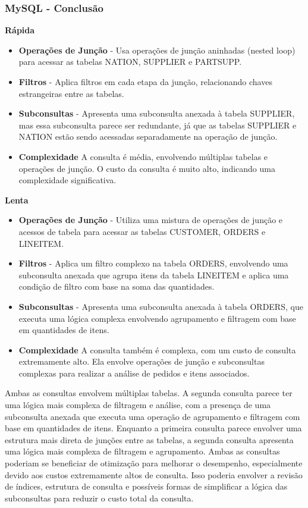 \documentclass{article}
\begin{document}
\subsubsection{MySQL - Conclusão}

  \textbf{Rápida}\\
  \begin{itemize}
    \item \textbf{Operações de Junção} - Usa operações de junção aninhadas (nested loop) para acessar as tabelas NATION, SUPPLIER e PARTSUPP.
    \item \textbf{Filtros} - Aplica filtros em cada etapa da junção, relacionando chaves estrangeiras entre as tabelas.
    \item \textbf{Subconsultas} - Apresenta uma subconsulta anexada à tabela SUPPLIER, mas essa subconsulta parece ser redundante, já que as tabelas SUPPLIER e NATION estão sendo acessadas separadamente na operação de junção.
    \item\textbf{Complexidade} A consulta é média, envolvendo múltiplas tabelas e operações de junção. O custo da consulta é muito alto, indicando uma complexidade significativa.
  \end{itemize}
  
  \textbf{Lenta}\\
  \begin{itemize}
    \item \textbf{Operações de Junção} - Utiliza uma mistura de operações de junção e acessos de tabela para acessar as tabelas CUSTOMER, ORDERS e LINEITEM.
    \item \textbf{Filtros} - Aplica um filtro complexo na tabela ORDERS, envolvendo uma subconsulta anexada que agrupa itens da tabela LINEITEM e aplica uma condição de filtro com base na soma das quantidades.
    \item \textbf{Subconsultas} - Apresenta uma subconsulta anexada à tabela ORDERS, que executa uma lógica complexa envolvendo agrupamento e filtragem com base em quantidades de itens.
    \item\textbf{Complexidade} A consulta também é complexa, com um custo de consulta extremamente alto. Ela envolve operações de junção e subconsultas complexas para realizar a análise de pedidos e itens associados.
  \end{itemize}
  Ambas as consultas envolvem múltiplas tabelas.
  A segunda consulta parece ter uma lógica mais complexa de filtragem e análise, com a presença de uma subconsulta anexada que executa uma operação de agrupamento e filtragem com base em quantidades de itens.
  Enquanto a primeira consulta parece envolver uma estrutura mais direta de junções entre as tabelas, a segunda consulta apresenta uma lógica mais complexa de filtragem e agrupamento.
  Ambas as consultas poderiam se beneficiar de otimização para melhorar o desempenho, especialmente devido aos custos extremamente altos de consulta. Isso poderia envolver a revisão de índices, estrutura de consulta e possíveis formas de simplificar a lógica das subconsultas para reduzir o custo total da consulta.
\end{document}
